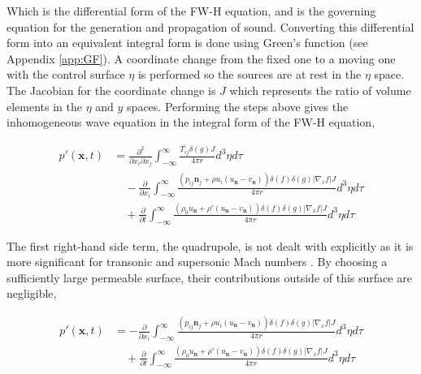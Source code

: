 Which is the differential form of the FW-H equation, and is the governing equation for the generation and propagation of sound. Converting this differential form into an equivalent integral form is done using Green's function (see Appendix \ref{app:GF}). A coordinate change from the fixed one to a moving one with the control surface $\eta$ is performed so the sources are at rest in the $\eta$ space. The Jacobian for the coordinate change is $J$ which represents the ratio of volume elements in the $\eta$ and $y$ spaces. Performing the steps above gives the inhomogeneous wave equation in the integral form of the FW-H equation,

\begin{equation}
    \begin{split}
        p'(\bm{x},t) &=
        \frac{\partial^2}{\partial x_i\partial x_j} \int_{-\infty}^{\infty} \frac{\overline{T_{ij}}\delta(g)J}{4\pi r}d^3\eta d\tau \\
        &\quad - \frac{\partial}{\partial x_i} \int_{-\infty}^\infty \frac{\left(p_{ij}\textbf{n}_j+\rho u_i (u_{\textbf{n}}-v_{\textbf{n}}) \right) \delta(f)\delta(g) |\nabla_xf|J}{4\pi r} d^3\eta d\tau \\
        &\quad + \frac{\partial}{\partial t} \int_{-\infty}^\infty \frac{\left(\rho_0u_{\textbf{n}} + \rho'(u_{\textbf{n}}-v_{\textbf{n}}) \right) \delta(f)\delta(g) |\nabla_xf|J}{4\pi r}d^3\eta d\tau
    \end{split}
    \label{eq:FWH}
\end{equation}

The first right-hand side term, the quadrupole, is not dealt with explicitly \cite{Parry1988, Hanson1985} as it is more significant for transonic and supersonic Mach numbers \cite{FfowcsWilliams1969, Ffowcs1969}. By choosing a sufficiently large permeable surface, their contributions outside of this surface are negligible,

\begin{equation}
    \begin{split}
        p'(\bm{x},t) &=
        - \frac{\partial}{\partial x_i} \int_{-\infty}^\infty \frac{\left(p_{ij}\textbf{n}_j+\rho u_i (u_{\textbf{n}}-v_{\textbf{n}}) \right) \delta(f)\delta(g) |\nabla_xf|J}{4\pi r} d^3\eta d\tau \\
        &\quad + \frac{\partial}{\partial t} \int_{-\infty}^\infty \frac{\left(\rho_0u_{\textbf{n}} + \rho'(u_{\textbf{n}}-v_{\textbf{n}}) \right) \delta(f)\delta(g) |\nabla_xf|J}{4\pi r}d^3\eta d\tau
    \end{split}
    \label{eq:FWH_no_quad}
\end{equation}

